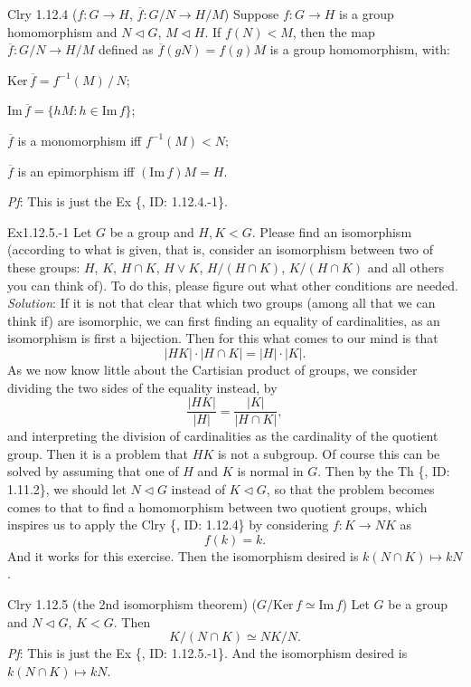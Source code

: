 \documentclass{article}
\newcommand{\nles}{\vartriangleleft}
\newcommand{\Ker}{\text{Ker}\,}
\newcommand{\Ima}{\text{Im}\,}
\begin{document}
\begin{Th}{Clry 1.12.4 ($f: G\to H$, $\overline{f}: G/N\to H/M$)}
    Suppose $f: G\to H$ is a group homomorphism and $N\nles G$, $M\nles H$. If $f(N)<M$, then the map $\overline{f}: G/N\to H/M$ defined as $\overline{f}(gN) = f(g)M$ is a group homomorphism, with:
    \begin{compactenum}
        \item $\Ker \overline{f} = f^{-1}(M)\,/\,N$;
        \item $\Ima \overline{f} = \{hM: h\in\Ima f\}$;
        \item $\overline{f}$ is a monomorphism iff $f^{-1}(M) < N$;
        \item $\overline{f}$ is an epimorphism iff $(\Ima f) M = H$.
    \end{compactenum}
    \tcblower
    \textit{Pf}: This is just the Ex \{, ID: 1.12.4.-1\}.
\end{Th}

\begin{Th}{Ex1.12.5.-1}
    Let $G$ be a group and $H, K< G$. Please find an isomorphism (according to what is given, that is, consider an isomorphism between two of these groups: $H$, $K$, $H\cap K$, $H\vee K$, $H/(H\cap K)$, $K/(H\cap K)$ and all others you can think of). To do this, please figure out what other conditions are needed.
    \tcblower
    \textit{Solution}: If it is not that clear that which two groups (among all that we can think if) are isomorphic, we can first finding an equality of cardinalities, as an isomorphism is first a bijection. Then for this what comes to our mind is that
    $$ |HK|\cdot |H\cap K|= |H|\cdot |K|. $$
    As we now know little about the Cartisian product of groups, we consider dividing the two sides of the equality instead, by
    $$ \frac{|HK|}{|H|} = \frac{|K|}{|H\cap K|}, $$
    and interpreting the division of cardinalities as the cardinality of the quotient group. Then it is a problem that $HK$ is not a subgroup. Of course this can be solved by assuming that one of $H$ and $K$ is normal in $G$. Then by the Th \{, ID: 1.11.2\}, we should let \textcolor{P}{$N\nles G$} instead of $K\nles G$, so that the problem becomes comes to that to find a homomorphism between two quotient groups, which inspires us to apply the Clry \{, ID: 1.12.4\} by considering $f: K\to NK$ as 
    $$ f(k) = k. $$
    And it works for this exercise. Then the isomorphism desired is $k(N\cap K)\mapsto kN$.
\end{Th}

\begin{Th}{Clry 1.12.5 (the 2nd isomorphism theorem) ($G/\Ker f \simeq \Ima f$)}
    Let $G$ be a group and $N\nles G$, $K<G$. Then
    $$ K/(N\cap K) \simeq NK/N. $$
    \tcblower
    \textit{Pf}: This is just the Ex \{, ID: 1.12.5.-1\}. And the isomorphism desired is $k(N\cap K)\mapsto kN$.
\end{Th}
\end{document}
